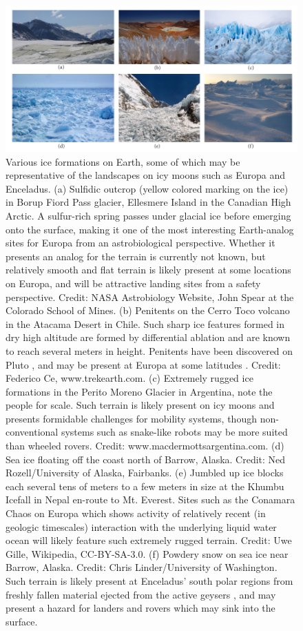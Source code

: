 \documentclass{article}
\begin{document}
\begin{figure}[hbt!]
\centering
\includegraphics[width=6.5in]{general-images/earth-analog-sites.pdf}
\caption{Various ice formations on Earth, some of which may be representative of the landscapes on icy moons such as Europa and Enceladus. (a) Sulfidic outcrop (yellow colored marking on the ice) in Borup Fiord Pass glacier, Ellesmere Island in the Canadian High Arctic. A sulfur-rich spring passes under glacial ice before emerging onto the surface, making it one of the most interesting Earth-analog sites for Europa from an astrobiological perspective. Whether it presents an analog for the terrain is currently not known, but relatively smooth and flat terrain is likely present at some locations on Europa, and will be attractive landing sites from a safety perspective. Credit: NASA Astrobiology Website, John Spear at the Colorado School of Mines. (b) Penitents on the Cerro Toco volcano in the Atacama Desert in Chile. Such sharp ice features formed in dry high altitude are formed by differential ablation and are known to reach several meters in height. Penitents have been discovered on Pluto \cite{moores2017penitentes}, and may be present at Europa at some latitudes \cite{hobley2018formation}. Credit: Federico Ce, www.trekearth.com. (c) Extremely rugged ice formations in the Perito Moreno Glacier in Argentina, note the people for scale. Such terrain is likely present on icy moons and presents formidable challenges for mobility systems, though non-conventional systems such as snake-like robots may be more suited than wheeled rovers. Credit: www.macdermottsargentina.com. (d) Sea ice floating off the coast north of Barrow, Alaska. Credit: Ned Rozell/University of Alaska, Fairbanks. (e) Jumbled up ice blocks each several tens of meters to a few meters in size at the Khumbu Icefall in Nepal en-route to Mt. Everest. Sites such as the Conamara Chaos on Europa which shows activity of relatively recent (in geologic timescales) interaction with the underlying liquid water ocean will likely feature such extremely rugged terrain. Credit: Uwe Gille, Wikipedia, CC-BY-SA-3.0. (f) Powdery snow on sea ice near Barrow, Alaska. Credit: Chris Linder/University of Washington. Such terrain is likely present at Enceladus' south polar regions from freshly fallen material ejected from the active geysers \cite{porco2006cassini}, and may present a hazard for landers and rovers which may sink into the surface.}
\label{fig:earth-analog-sites}
\end{figure}
\end{document}
